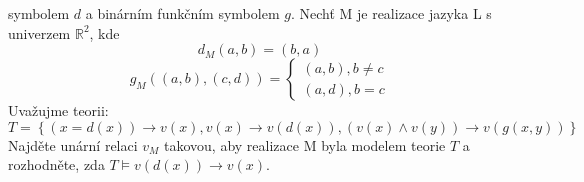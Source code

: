 symbolem $d$ a binárním funkčním symbolem $g$. Nechť M je realizace jazyka L s
univerzem $\mathbb{R}^{2}$, kde
$$d_{M}(a,b)=(b,a)$$
$$g_{M}((a,b),(c,d))=\left\{\begin{matrix}
(a,b),b \neq c\\(a,d), b=c
\end{matrix}\right.$$
Uvažujme teorii: $T=\left \{ \left ( x=d(x) \right )\rightarrow
v(x),v(x)\rightarrow v(d(x)), (v(x)\wedge v(y))\rightarrow v(g(x,y))\right \}$
Najděte unární relaci $v_{M}$ takovou, aby realizace M byla modelem teorie $T$ a
rozhodněte, zda $T\models v(d(x)) \rightarrow v(x)$.
